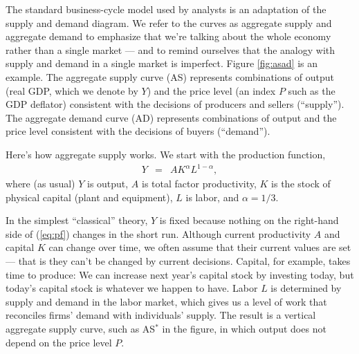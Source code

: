 The standard business-cycle model used by analysts
is an adaptation of the supply and demand diagram.
We refer to the curves as aggregate supply and aggregate
demand to emphasize that we're talking about the whole economy
rather than a single market --- and to remind ourselves that the analogy with supply and demand
in a single market is imperfect.
Figure \ref{fig:asad} is an example.
The aggregate supply curve (AS) represents combinations of
output (real GDP, which we denote by $Y$) and the price level
(an index $P$ such as the GDP deflator)
consistent with the decisions of producers and sellers (``supply'').
The aggregate demand curve (AD)
represents combinations of output and the price
level consistent with the decisions of buyers (``demand'').

Here's how aggregate supply works.
We start with the production function,
\begin{eqnarray}
    Y &=& A K^\alpha L^{1-\alpha} ,
    \label{eq:pf}
\end{eqnarray}
where (as usual) $Y$ is output, $A$ is total factor productivity,
$K$ is the stock of physical capital (plant and equipment),
$L$ is labor, and $ \alpha = 1/3$.

In the simplest ``classical'' theory, $Y$ is fixed
because nothing on the right-hand side of (\ref{eq:pf}) changes in the short run.
Although current productivity $A$ and capital $K$ can change over time,
we often assume that their current values are set --- that is
they can't be changed by current decisions.
Capital, for example, takes time to produce:
We can increase next year's capital stock by investing today,
but today's capital stock is whatever we happen to have.
Labor $L$ is determined by supply and demand in the labor market,
which gives us a level of work that reconciles firms'
demand with individuals' supply.
The result is a vertical aggregate supply curve,
such as AS$^*$ in the figure,
in which output does not depend on the price level $P$.


